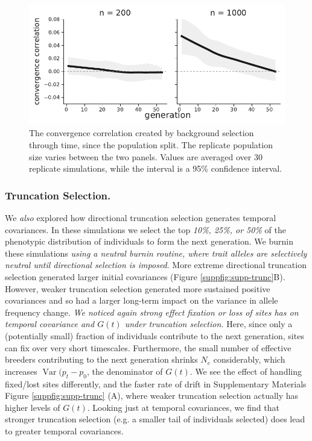 \documentclass[11pt]{article}
\newcommand{\gc}[1]{{\it \color{red} #1 } }
\newcommand{\vb}[1]{{\it \color{blue} #1}}
\DeclareMathOperator{\var}{Var}
\begin{document}
{\begin{figure}[!ht]
  \centering
  \includegraphics[width=\textwidth]{figures/fig-bgs-convergence-correlation.pdf}

  \caption{The convergence correlation created by background selection through
    time, since the population split. The replicate population size varies
    between the two panels. Values are averaged over 30 replicate simulations,
    while the interval is a 95\% confidence interval.}

  \label{suppfig:supp-bgs-converg}
\end{figure}


\subsubsection{Truncation Selection.}
We \vb{also} explored how directional truncation selection generates temporal
covariances. In these simulations we select the top \vb{10\%, 25\%, or 50\%} of
the phenotypic distribution of individuals to form the next generation. We
burnin these simulations \vb{using a neutral burnin routine, where trait
alleles are selectively neutral until directional selection is imposed}. More
extreme directional truncation selection generated larger initial covariances
(Figure \ref{suppfig:supp-trunc}B).  However, weaker truncation selection
generated more sustained positive covariances and so had a larger long-term
impact on the variance in allele frequency change. 
\gc{We noticed again strong effect fixation  or loss of sites
has on temporal covariance and $G(t)$ under truncation selection.}  Here,
since only a (potentially small) fraction of individuals contribute to the next
generation, sites can fix over very short timescales. Furthermore, the small
number of effective breeders contributing to the next generation shrinks $N_e$
considerably, which increases $\var(p_t - p_0$, the denominator of $G(t)$. We
see the effect of handling fixed/lost sites differently, and the faster rate of
drift in Supplementary Materials Figure \ref{suppfig:supp-trunc} (A), where
weaker truncation selection actually has higher levels of $G(t)$. Looking just
at temporal covariances, we find that stronger truncation selection (e.g.  a
smaller tail of individuals selected) does lead to greater temporal
covariances.


}
\end{document}
